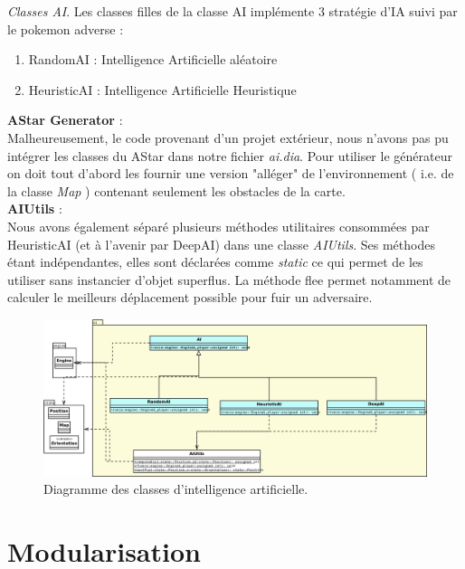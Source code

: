 \documentclass[a4paper,12pt]{article}
\begin{document}
    \emph{Classes AI}. Les classes filles de la classe AI implémente 3 stratégie d'IA suivi par le pokemon adverse :\begin{enumerate}
      
\item RandomAI : Intelligence Artificielle aléatoire
\item HeuristicAI :  Intelligence Artificielle Heuristique
    \end{enumerate}
    \textbf{AStar Generator} :
    \\Malheureusement, le code provenant d'un projet extérieur, nous n'avons pas pu intégrer les classes du AStar dans notre fichier \emph{ai.dia}.
    Pour utiliser le générateur on doit tout d'abord les fournir une version "alléger" de l'environnement ( i.e. de la classe \emph{Map} ) contenant seulement les obstacles de la carte.
   \\\textbf{AIUtils} :
   \\Nous avons également séparé plusieurs méthodes utilitaires consommées par HeuristicAI (et à l'avenir par DeepAI) dans une classe \emph{AIUtils}. Ses méthodes étant indépendantes, elles sont déclarées comme \emph{static} ce qui permet de les utiliser sans instancier d'objet superflus. 
   La méthode flee permet notamment de calculer le meilleurs déplacement possible pour fuir un adversaire.
    


    \begin{landscape}
    \begin{figure}[p]
    \includegraphics[width=0.9\paperheight]{ai.png}
    \caption{\label{uml:ai}Diagramme des classes d'intelligence artificielle.}
    \end{figure}
    \end{landscape}


    \section{Modularisation}
    \label{sec:module}
\end{document}
